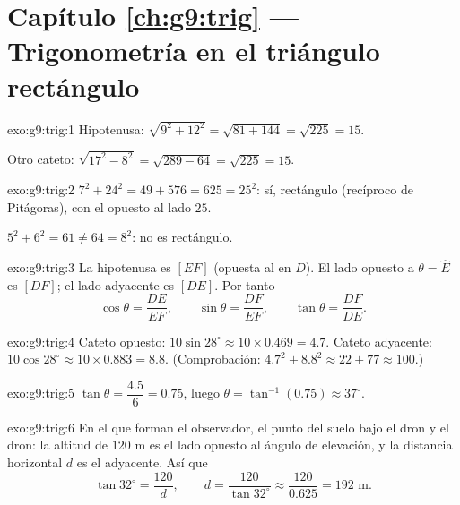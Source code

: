 \section*{Capítulo \ref{ch:g9:trig} --- Trigonometría en el triángulo rectángulo}

\begin{solution}{exo:g9:trig:1}
Hipotenusa: $\sqrt{9^2 + 12^2} = \sqrt{81 + 144} = \sqrt{225} = 15$.

Otro cateto: $\sqrt{17^2 - 8^2} = \sqrt{289 - 64} = \sqrt{225} = 15$.
\end{solution}

\begin{solution}{exo:g9:trig:2}
$7^2 + 24^2 = 49 + 576 = 625 = 25^2$: sí, rectángulo (recíproco de
Pitágoras), con el  opuesto al lado $25$.

$5^2 + 6^2 = 61 \neq 64 = 8^2$: no es rectángulo.
\end{solution}

\begin{solution}{exo:g9:trig:3}
La hipotenusa es $[EF]$ (opuesta al  en $D$). El lado
opuesto a $\theta = \widehat E$ es $[DF]$; el lado adyacente es
$[DE]$. Por tanto
\[
\cos\theta = \frac{DE}{EF}, \qquad
\sin\theta = \frac{DF}{EF}, \qquad
\tan\theta = \frac{DF}{DE}.
\]
\end{solution}

\begin{solution}{exo:g9:trig:4}
Cateto opuesto: $10 \sin 28^\circ \approx 10 \times 0.469 = 4.7$.
Cateto adyacente: $10 \cos 28^\circ \approx 10 \times 0.883 = 8.8$.
(Comprobación: $4.7^2 + 8.8^2 \approx 22 + 77 \approx 100$.)
\end{solution}

\begin{solution}{exo:g9:trig:5}
$\tan\theta = \dfrac{4.5}{6} = 0.75$, luego
$\theta = \tan^{-1}(0.75) \approx 37^\circ$.
\end{solution}

\begin{solution}{exo:g9:trig:6}
En el  que forman el observador, el punto del suelo
bajo el dron y el dron: la altitud de $120$ m es el lado
opuesto al ángulo de elevación, y la distancia horizontal $d$ es el adyacente.
Así que
\[
\tan 32^\circ = \frac{120}{d},
\qquad
d = \frac{120}{\tan 32^\circ} \approx \frac{120}{0.625} = 192 \text{ m}.
\]
\end{solution}

